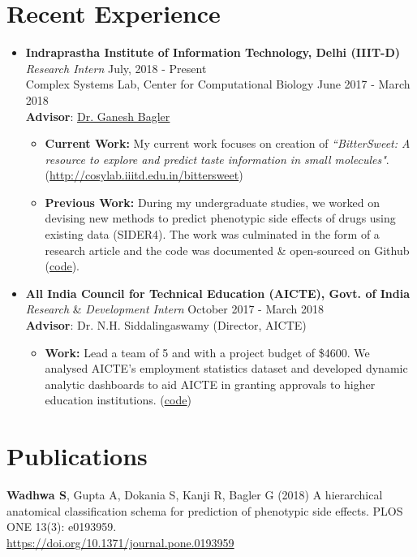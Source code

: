 \documentclass[margin,line]{res}
\begin{document}
\begin{resume}
\section{\sc Recent Experience}
\begin{itemize}[leftmargin=*]
\item {\bf Indraprastha Institute of Information Technology, Delhi (IIIT-D)}\\
\textit{Research Intern} \hfill July, 2018 - Present\\
Complex Systems Lab, Center for Computational Biology \hfill June 2017 - March 2018 \\  
{\bf Advisor}: {\href{https://scholar.google.co.in/citations?user=qyth_0QAAAAJ&hl=en}{\underline{Dr. Ganesh Bagler}}}
\begin{itemize}[leftmargin=*]
\item {\bf Current Work:} My current work focuses on creation of \textit{``BitterSweet: A resource to explore and predict taste information in small molecules"}. ({\href{http://cosylab.iiitd.edu.in/bittersweet/}{http://cosylab.iiitd.edu.in/bittersweet}})
\item {\bf Previous Work:} During my undergraduate studies, we worked on devising new methods to predict phenotypic side effects of drugs using existing data (SIDER4). The work was culminated in the form of a research article and the code was documented \& open-sourced on Github ({\href{https://github.com/sominwadhwa/drugADR}{\underline{code}}}).
\end{itemize}
\item {\bf All India Council for Technical Education (AICTE), Govt. of India}\\
\textit{Research} \& \textit{Development Intern} \hfill October 2017 - March 2018\\  
{\bf Advisor}: Dr. N.H. Siddalingaswamy (Director, AICTE)
\begin{itemize}[leftmargin=*]
\item {\bf Work:} Lead a team of 5 and with a project budget of \$4600. We analysed AICTE's employment statistics dataset and developed dynamic analytic dashboards to aid AICTE in granting approvals to higher education institutions. ({\href{https://github.com/TeamExtrapolate/extrapolate}{\underline{code}}})
\end{itemize}
\end{itemize}

\section{\sc Publications}
{\bf Wadhwa S}, Gupta A, Dokania S, Kanji R, Bagler G (2018) A hierarchical anatomical classification schema for prediction of phenotypic side effects. PLOS ONE 13(3): e0193959. 
\\{\href{https://doi.org/10.1371/journal.pone.0193959}{https://doi.org/10.1371/journal.pone.0193959}}


\end{resume}
\end{document}
